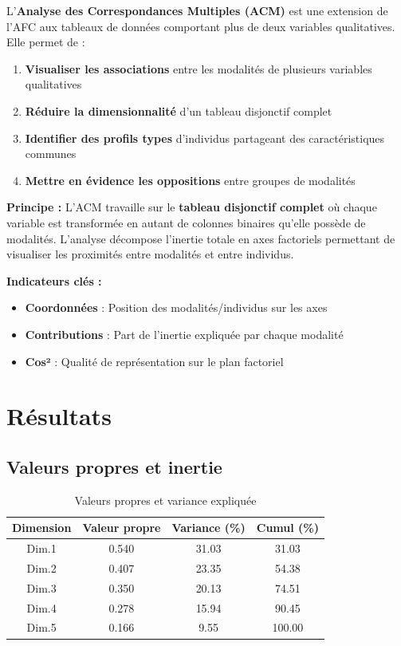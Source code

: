 \documentclass[12pt,a4paper]{article}
\begin{document}
L'\textbf{Analyse des Correspondances Multiples (ACM)} est une extension de l'AFC aux tableaux de données comportant plus de deux variables qualitatives. Elle permet de :

\begin{enumerate}
    \item \textbf{Visualiser les associations} entre les modalités de plusieurs variables qualitatives
    \item \textbf{Réduire la dimensionnalité} d'un tableau disjonctif complet
    \item \textbf{Identifier des profils types} d'individus partageant des caractéristiques communes
    \item \textbf{Mettre en évidence les oppositions} entre groupes de modalités
\end{enumerate}

\textbf{Principe :} L'ACM travaille sur le \textbf{tableau disjonctif complet} où chaque variable est transformée en autant de colonnes binaires qu'elle possède de modalités. L'analyse décompose l'inertie totale en axes factoriels permettant de visualiser les proximités entre modalités et entre individus.

\textbf{Indicateurs clés :}
\begin{itemize}
    \item \textbf{Coordonnées} : Position des modalités/individus sur les axes
    \item \textbf{Contributions} : Part de l'inertie expliquée par chaque modalité
    \item \textbf{Cos²} : Qualité de représentation sur le plan factoriel
\end{itemize}

\section{Résultats}

\subsection{Valeurs propres et inertie}

\begin{table}[H]
\centering
\caption{Valeurs propres et variance expliquée}
\begin{tabular}{|c|c|c|c|}
\hline
\textbf{Dimension} & \textbf{Valeur propre} & \textbf{Variance (\%)} & \textbf{Cumul (\%)} \\
\hline
Dim.1 & 0.540 & 31.03 & 31.03 \\
Dim.2 & 0.407 & 23.35 & 54.38 \\
Dim.3 & 0.350 & 20.13 & 74.51 \\
Dim.4 & 0.278 & 15.94 & 90.45 \\
Dim.5 & 0.166 & 9.55 & 100.00 \\
\hline
\end{tabular}
\end{table}
\end{document}
